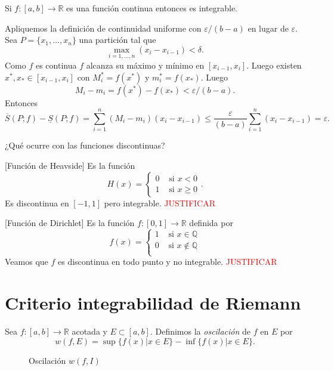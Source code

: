 \begin{teorema}{}  Si $f:[a,b]\to\mathbb{R}$ es una función continua entonces es integrable.
\end{teorema}
\begin{demo}  Apliquemos la definición de continuidad uniforme con $\varepsilon/(b-a)$ en lugar de $\varepsilon$. Sea $P=\{x_1,\ldots,x_n\}$ una partición tal que
\[
 \max_{i=1,\ldots,n}(x_i-x_{i-1})<\delta.
\]
Como $f$ es continua $f$ alcanza su máximo y mínimo en $[x_{i-1},x_i]$. Luego existen $x^*,x_*\in [x_{i-1},x_i]$ con $M_i^*=f(x^*)$ y $m_i^*=f(x_*)$.  Luego
\[
 M_i-m_i=f(x^*)-f(x_*)<\varepsilon/(b-a).
 \]
Entonces 
\[
 \overline{S}(P;f)-\underline{S}(P;f)=\sum_{i=1}^n(M_i-m_i)(x_i-x_{i-1})\leq \frac{\varepsilon}{(b-a)}\sum_{i=1}^n (x_i-x_{i-1})=\varepsilon.
\]


 \end{demo}

 
¿Qué ocurre con las funciones discontinuas? 

\begin{ejemplo}{}[Función de Heavside] Es la función
\[
 H(x)=\begin{cases}0 & \text{ si } x<0\\1 & \text{ si } x\geq 0\end{cases}.
\]
Es discontinua en $[-1,1]$ pero integrable.  \textcolor{red}{JUSTIFICAR}
 
\end{ejemplo}


\begin{ejemplo}{}[Función de Dirichlet] Es la función $f:[0,1]\to\mathbb{R}$ definida por 
\[
 f(x)=\begin{cases} 1 & \text{ si } x\in\mathbb{Q}\\0 & \text{ si }   x\notin\mathbb{Q}\\
\end{cases}
\]
Veamos que $f$ es discontinua en todo punto y no integrable. \textcolor{red}{JUSTIFICAR}
\end{ejemplo}


 \section{Criterio integrabilidad de Riemann}
 
\begin{definicion}[Oscilación]{} Sea $f:[a,b]\to\mathbb{R}$ acotada y $E\subset [a,b]$. Definimos la \emph{oscilación} de $f$ en $E$ por 
\[
 w(f,E)=\sup\{f(x)| x\in E\}-\inf\{f(x)| x\in E\}.
\]
\end{definicion}
\begin{figure}[h]
 \begin{center}

 \end{center}
 \caption{Oscilación $w(f,I)$}\label{fig:paral-trig}
\end{figure}

